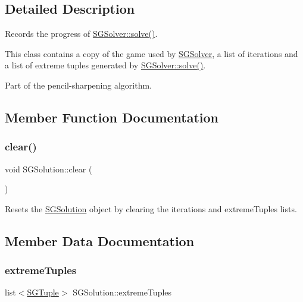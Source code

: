 \subsection{Detailed Description}
Records the progress of \hyperlink{classSGSolver_a220dd431eabdd9ff8419fafb28b7b990}{S\+G\+Solver\+::solve()}. 

This class contains a copy of the game used by \hyperlink{classSGSolver}{S\+G\+Solver}, a list of iterations and a list of extreme tuples generated by \hyperlink{classSGSolver_a220dd431eabdd9ff8419fafb28b7b990}{S\+G\+Solver\+::solve()}.

Part of the pencil-\/sharpening algorithm. 

\subsection{Member Function Documentation}
\mbox{\label{classSGSolution_a68da05d07ecac89a12e8534e3cfb1cf1}} 
\subsubsection{\texorpdfstring{clear()}{clear()}}
{\footnotesize\ttfamily void S\+G\+Solution\+::clear (\begin{DoxyParamCaption}{ }\end{DoxyParamCaption})\hspace{0.3cm}{\ttfamily [inline]}}

Resets the \hyperlink{classSGSolution}{S\+G\+Solution} object by clearing the iterations and extreme\+Tuples lists. 

\subsection{Member Data Documentation}
\mbox{\label{classSGSolution_a8b3448a35113785102b6c5193ab87dc6}} 
\subsubsection{\texorpdfstring{extreme\+Tuples}{extremeTuples}}
{\footnotesize\ttfamily list$<$\hyperlink{classSGTuple}{S\+G\+Tuple}$>$ S\+G\+Solution\+::extreme\+Tuples\hspace{0.3cm}{\ttfamily [private]}}

